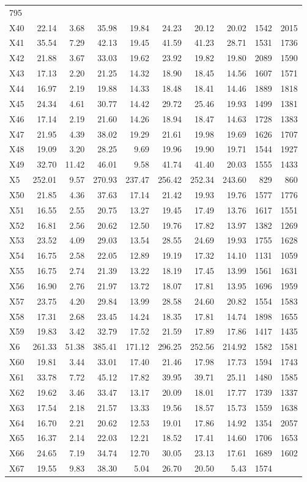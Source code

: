 \documentclass[
]{article}
\begin{document}
\begin{longtable}[]{@{}lrrrrrrrrr@{}}
795\tabularnewline
X40 & 22.14 & 3.68 & 35.98 & 19.84 & 24.23 & 20.12 & 20.02 & 1542 &
2015\tabularnewline
X41 & 35.54 & 7.29 & 42.13 & 19.45 & 41.59 & 41.23 & 28.71 & 1531 &
1736\tabularnewline
X42 & 21.88 & 3.67 & 33.03 & 19.62 & 23.92 & 19.82 & 19.80 & 2089 &
1590\tabularnewline
X43 & 17.13 & 2.20 & 21.25 & 14.32 & 18.90 & 18.45 & 14.56 & 1607 &
1571\tabularnewline
X44 & 16.97 & 2.19 & 19.88 & 14.33 & 18.48 & 18.41 & 14.46 & 1889 &
1818\tabularnewline
X45 & 24.34 & 4.61 & 30.77 & 14.42 & 29.72 & 25.46 & 19.93 & 1499 &
1381\tabularnewline
X46 & 17.14 & 2.19 & 21.60 & 14.26 & 18.94 & 18.47 & 14.63 & 1728 &
1383\tabularnewline
X47 & 21.95 & 4.39 & 38.02 & 19.29 & 21.61 & 19.98 & 19.69 & 1626 &
1707\tabularnewline
X48 & 19.09 & 3.20 & 28.25 & 9.69 & 19.96 & 19.90 & 19.71 & 1544 &
1927\tabularnewline
X49 & 32.70 & 11.42 & 46.01 & 9.58 & 41.74 & 41.40 & 20.03 & 1555 &
1433\tabularnewline
X5 & 252.01 & 9.57 & 270.93 & 237.47 & 256.42 & 252.34 & 243.60 & 829 &
860\tabularnewline
X50 & 21.85 & 4.36 & 37.63 & 17.14 & 21.42 & 19.93 & 19.76 & 1577 &
1776\tabularnewline
X51 & 16.55 & 2.55 & 20.75 & 13.27 & 19.45 & 17.49 & 13.76 & 1617 &
1551\tabularnewline
X52 & 16.81 & 2.56 & 20.62 & 12.50 & 19.76 & 17.82 & 13.97 & 1382 &
1269\tabularnewline
X53 & 23.52 & 4.09 & 29.03 & 13.54 & 28.55 & 24.69 & 19.93 & 1755 &
1628\tabularnewline
X54 & 16.75 & 2.58 & 22.05 & 12.89 & 19.19 & 17.32 & 14.10 & 1131 &
1059\tabularnewline
X55 & 16.75 & 2.74 & 21.39 & 13.22 & 18.19 & 17.45 & 13.99 & 1561 &
1631\tabularnewline
X56 & 16.90 & 2.76 & 21.97 & 13.72 & 18.07 & 17.81 & 13.95 & 1696 &
1959\tabularnewline
X57 & 23.75 & 4.20 & 29.84 & 13.99 & 28.58 & 24.60 & 20.82 & 1554 &
1583\tabularnewline
X58 & 17.31 & 2.68 & 23.45 & 14.24 & 18.35 & 17.81 & 14.74 & 1898 &
1655\tabularnewline
X59 & 19.83 & 3.42 & 32.79 & 17.52 & 21.59 & 17.89 & 17.86 & 1417 &
1435\tabularnewline
X6 & 261.33 & 51.38 & 385.41 & 171.12 & 296.25 & 252.56 & 214.92 & 1582
& 1581\tabularnewline
X60 & 19.81 & 3.44 & 33.01 & 17.40 & 21.46 & 17.98 & 17.73 & 1594 &
1743\tabularnewline
X61 & 33.78 & 7.72 & 45.12 & 17.82 & 39.95 & 39.71 & 25.11 & 1480 &
1585\tabularnewline
X62 & 19.62 & 3.46 & 33.47 & 13.17 & 20.09 & 18.01 & 17.77 & 1739 &
1337\tabularnewline
X63 & 17.54 & 2.18 & 21.57 & 13.33 & 19.56 & 18.57 & 15.73 & 1559 &
1638\tabularnewline
X64 & 16.70 & 2.21 & 20.62 & 12.53 & 19.01 & 17.86 & 14.92 & 1354 &
2057\tabularnewline
X65 & 16.37 & 2.14 & 22.03 & 12.21 & 18.52 & 17.41 & 14.60 & 1706 &
1653\tabularnewline
X66 & 24.65 & 7.19 & 34.74 & 12.70 & 30.05 & 23.13 & 17.61 & 1689 &
1602\tabularnewline
X67 & 19.55 & 9.83 & 38.30 & 5.04 & 26.70 & 20.50 & 5.43 & 1574 &

\end{longtable}
\end{document}
